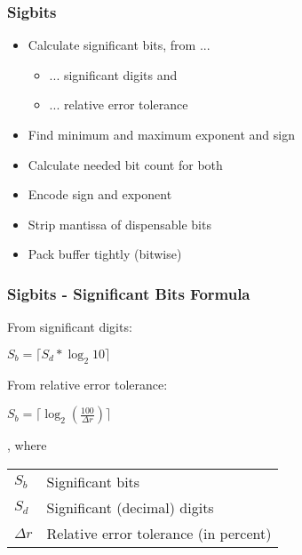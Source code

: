 \documentclass[compress]{beamer}
\begin{document}
\begin{frame}
	\frametitle{Sigbits}

	\begin{itemize}
		\item Calculate significant bits, from ...
		\begin{itemize}
			\item ... significant digits and
			\item ... relative error tolerance
		\end{itemize}
		\item Find minimum and maximum exponent and sign
		\item Calculate needed bit count for both
		\item Encode sign and exponent
		\item Strip mantissa of dispensable bits
		\item Pack buffer tightly (bitwise)
	\end{itemize}

\end{frame}

\begin{frame}
	\frametitle{Sigbits - Significant Bits Formula}

	From significant digits:
	\begin{center}
		$S_{b} = \lceil S_d * \log_2{10}\rceil$
	\end{center}

	\bigskip

	From relative error tolerance:
	\begin{center}
		$S_{b} = \lceil \log_2{\left(\frac{100}{\Delta{r}}\right)}\rceil$
	\end{center}

	, where\\

	\bigskip

	\begin{tabular}{ll}
		$S_b$ & Significant bits \\
		$S_d$ & Significant (decimal) digits \\
		$\Delta{r}$ & Relative error tolerance (in percent)
	\end{tabular}

\end{frame}
\end{document}
